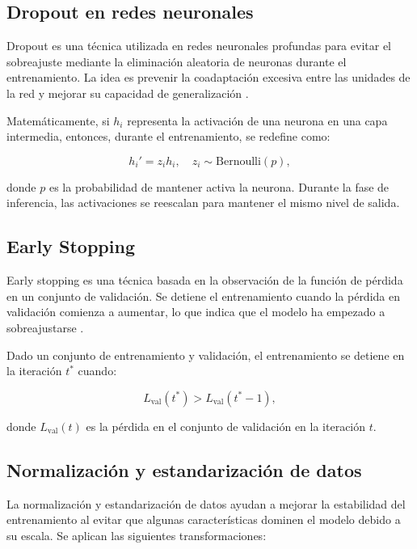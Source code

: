 \begin{itemize}
		\subsection{Dropout en redes neuronales}
		
		Dropout es una técnica utilizada en redes neuronales profundas para evitar el sobreajuste mediante la eliminación aleatoria de neuronas durante el entrenamiento. La idea es prevenir la coadaptación excesiva entre las unidades de la red y mejorar su capacidad de generalización \cite{srivastava2014dropout}.
		
		Matemáticamente, si \(h_i\) representa la activación de una neurona en una capa intermedia, entonces, durante el entrenamiento, se redefine como:
		
		\begin{equation}
			h_i' = z_i h_i, \quad z_i \sim \text{Bernoulli}(p),
		\end{equation}
		
		donde \(p\) es la probabilidad de mantener activa la neurona. Durante la fase de inferencia, las activaciones se reescalan para mantener el mismo nivel de salida.
		
		\subsection{Early Stopping}
		
		Early stopping es una técnica basada en la observación de la función de pérdida en un conjunto de validación. Se detiene el entrenamiento cuando la pérdida en validación comienza a aumentar, lo que indica que el modelo ha empezado a sobreajustarse \cite{prechelt1998early}.
		
		Dado un conjunto de entrenamiento y validación, el entrenamiento se detiene en la iteración \(t^*\) cuando:
		
		\begin{equation}
			L_{\text{val}}(t^*) > L_{\text{val}}(t^*-1),
		\end{equation}
		
		donde \(L_{\text{val}}(t)\) es la pérdida en el conjunto de validación en la iteración \(t\).
		
		\subsection{Normalización y estandarización de datos}
		
		La normalización y estandarización de datos ayudan a mejorar la estabilidad del entrenamiento al evitar que algunas características dominen el modelo debido a su escala. Se aplican las siguientes transformaciones:
		

\end{itemize}
